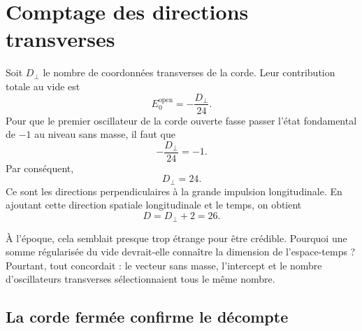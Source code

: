 \section{Comptage des directions transverses}

Soit \(D_\perp\) le nombre de coordonnées transverses de la corde. Leur
contribution totale au vide est
\begin{equation}
  E_0^{\mathrm{open}}
  =-\frac{D_\perp}{24}.
  \label{eq:l05-open-vacuum}
\end{equation}
Pour que le premier oscillateur de la corde ouverte fasse passer l’état
fondamental de \(-1\) au niveau sans masse, il faut que
\begin{equation}
  -\frac{D_\perp}{24}=-1.
\end{equation}
Par conséquent,
\begin{equation}
  D_\perp=24.
\end{equation}
Ce sont les directions perpendiculaires à la grande impulsion longitudinale.
En ajoutant cette direction spatiale longitudinale et le temps, on obtient
\begin{equation}
  D=D_\perp+2=26.
  \label{eq:l05-critical-dimension}
\end{equation}

\begin{classroomqa}
\end{classroomqa}

À l’époque, cela semblait presque trop étrange pour être crédible. Pourquoi
une somme régularisée du vide devrait-elle connaître la dimension de
l’espace-temps ? Pourtant, tout concordait : le vecteur sans masse,
l’intercept et le nombre d’oscillateurs transverses sélectionnaient tous le
même nombre.

\subsection{La corde fermée confirme le décompte}

